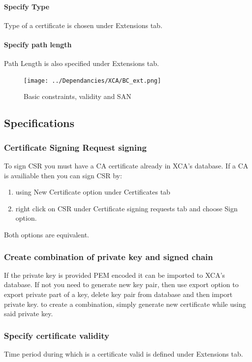 \documentclass[10pt, a4paper]{report}
\begin{document}
{      \paragraph{Specify Type}
Type of a certificate is chosen under Extensions tab.
      \paragraph{Specify path length}
Path Length is also specified under Extensions tab.

\begin{figure}[!ht]
 \caption{Basic constraints, validity and SAN}
 \centering
  \texttt{[image: ../Dependancies/XCA/BC\_ext.png]}
\end{figure}

  \subsection{Specifications}
  
    \subsubsection{Certificate Signing Request signing}
To sign CSR you must have a CA certificate already in XCA's database. If a CA is availiable then you can sign CSR by:

\begin{enumerate}
\item using New Certificate option under Certificates tab 
\item right click on CSR under Certificate signing requests tab and choose Sign option. 
\end{enumerate}
Both options are equivalent.    

    \subsubsection{Create combination of private key and signed chain}
If the private key is provided PEM encoded it can be imported to XCA's database. If not you need to generate new key pair, then use export option to export private part of a key, delete key pair from database and then import private key. to create a combination, simply generate new certificate while using said private key.
    \subsubsection{Specify certificate validity}
Time period during which is a certificate valid is defined under Extensions tab.
}
\end{document}
